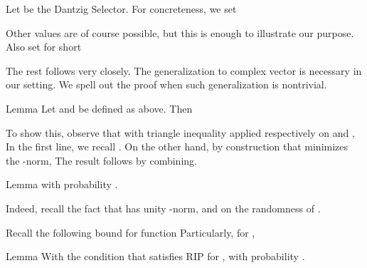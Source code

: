 \startsection [title={Expected Error Analysis for Dantzig Selector}]
\startsubsection [title={Generalizing Technical Lemmata for Complex Case}]

Let  be the Dantzig Selector.
For concreteness, we set

Other values are of course possible, but this is enough to illustrate our purpose.
Also set for short

The rest follows  very closely.
The generalization to complex vector is necessary in our setting.
We spell out the proof when such generalization is nontrivial.

\Result
{Lemma}
{
Let  and  be defined as above.
Then
}

To show this, observe that with triangle inequality applied respectively on  and ,
In the first line, we recall .
On the other hand, by construction that  minimizes the -norm,
The result follows by combining.

\Result
{Lemma}
{
with probability .
}

Indeed, recall the fact that  has unity -norm, and on the randomness of .

Recall the following bound for  function
Particularly, for ,

\Result
{Lemma}
{
With the condition that  satisfies RIP for ,
with probability .
}


